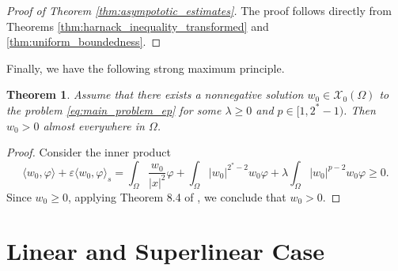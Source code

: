 \documentclass[11pt]{article}
\newtheorem{theorem}{Theorem}[section] %
\newcommand{\X}{\mathcal{X}_0} %
\begin{document}


\begin{proof}[Proof of Theorem \ref{thm:asympototic_estimates}]
 The proof follows directly from Theorems \ref{thm:harnack_inequality_transformed} and \ref{thm:uniform_boundedness}.   
\end{proof}

Finally, we have the following strong maximum principle. 
\begin{theorem}\label{thm:uniform_estimate_and_smp}
Assume that there exists a nonnegative solution $w_0 \in \X(\Omega)$ to the problem \eqref{eq:main_problem_ep} for some $\lambda \geq 0$ and $p \in [1,2^*-1)$. Then $w_0 >0$ almost everywhere in $\Omega$.
\end{theorem}
\begin{proof}
Consider the inner product
\begin{equation*}
\langle w_0, \varphi \rangle + \varepsilon\langle w_0, \varphi \rangle_{s} = \int_{\Omega} \frac{w_0}{|x|^2} \varphi + \int_{\Omega} |w_0|^{2^*-2} w_0 \varphi + \lambda \int_{\Omega} |w_0|^{p-2} w_0 \varphi \geq 0.
\end{equation*}
Since $w_0 \geq 0$, applying Theorem 8.4 of \cite{garain_higher_holder_regularity}, we conclude that $w_0 > 0$.
\end{proof}


\section{Linear and Superlinear Case}\label{sec:linear_sublinear}
\end{document}
